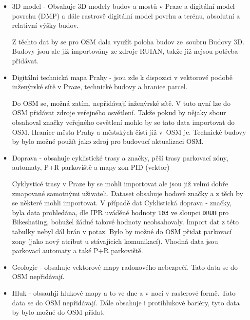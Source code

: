 \begin{itemize}
    \item   3D model - Obsahuje 3D modely budov a mostů v Praze a digitální
            model povrchu (DMP) a dále rastrově digitální model povrhu a
            terénu, absolutní a relativní výšky budov.

            Z těchto dat by se pro OSM dala využít poloha budov ze~soubru
            Budovy 3D. Budovy jsou ale již importovány ze zdroje RUIAN, takže
            již nejsou potřeba přidávat.

    \item   Digitální technická mapa Prahy - jsou zde k dispozici v vektorové
            podobě inženýrské sítě v Praze, technické budovy a hranice parcel.

            Do OSM se, možná zatím, nepřidávají inženýrské sítě. V tuto nyní
            lze do OSM přidávat zdroje veřejného osvětlení. Takže pokud by
            nějaky sbour obsahoval značky veřejného osvětlení mohlo by se tato
            data importovat do OSM. Hranice města Prahy a městských čístí již
            v~OSM je. Technické budovy by bylo možné použít jako zdroj
            pro budovucí aktualizaci OSM.

    \item   Doprava - obsahuje cyklistické trasy a značky, pěší trasy
            parkovací zóny, automaty, P+R parkoviště a mapy zon PID (vektor)

            Cyklysticé trasy v Praze by se mohli importovat ale jsou již velmi
            dobře zmapované samotnými uživateli. Dataset obsahuje bodové značky
            a z těch by se některé mohli importovat.
            V případě dat Cyklistická doprava - značky, byla data prohledána, dle IPR
            uváděné hodnoty {\tt 103} ve sloupci {\tt DRUH} pro Bikeshating, bohužel žádné
            takové hodnoty neobsahovaly. Import dat z této tabulky nebyl dál brán v potaz.
            Bylo by možné do OSM přidat parkovací zony (jako nový atribut u stávajících komunikací).
            Vhodná data jsou parkovací automaty a také P+R parkoviště.

    \item   Geologie - obsahuje vektorové mapy radonového nebezpečí. Tato data
            se do OSM nepřidávají.

    \item   Hluk - obsauhjí hlukové mapy a to ve dne a v noci v rasterové formě.
            Tato data se do OSM nepřidávají. Dále obsahuje i protihlukové bariéry,
            tyto data by bylo možné do OSM přidat.


\end{itemize}
